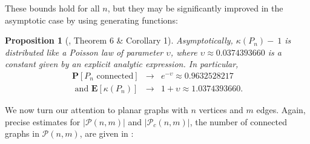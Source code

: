 \documentclass{article}
\newtheorem{Proposition}[Theorem]{Proposition}
\newtheorem{Proof of Theorem}{Proof of Theorem}
\begin{document}
These bounds hold for all $n$,
but they may be significantly improved in the asymptotic case by using generating functions:















\begin{Proposition}[\cite{gim}, Theorem 6 \& Corollary 1] \label{gim T6}
Asymptotically, $\kappa (P_{n}) -~\!1$ is distributed like a Poisson law of parameter $\upsilon$,
where $\upsilon \approx 0.0374393660$ is a constant given by an explicit analytic expression.
In particular, 
\begin{eqnarray*}
\mathbf{P}[P_{n} \textrm{ connected}] & \to & e^{-\upsilon} \approx 0.9632528217 \\
\textrm{ and } \mathbf{E}[\kappa (P_{n})] & \to & 1+ \upsilon \approx 1.0374393660. 
\end{eqnarray*} 
\end{Proposition}














We now turn our attention to planar graphs with $n$ vertices and $m$ edges.
Again, precise estimates for $|\mathcal{P}(n,m)|$ and $|\mathcal{P}_{c}(n,m)|$,
the number of connected graphs in $\mathcal{P}(n,m)$,
are given in \cite{gim}:
\end{document}
